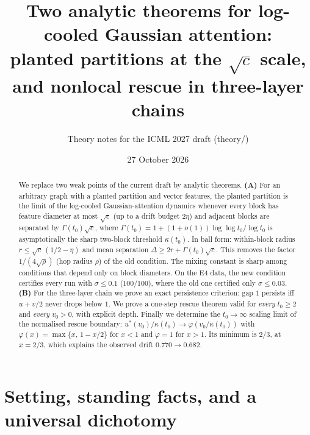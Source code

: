 \documentclass[11pt]{article}
\title{Two analytic theorems for log-cooled Gaussian attention:\\
planted partitions at the $\sqrt c$ scale, and nonlocal rescue in three-layer chains}
\author{Theory notes for the ICML 2027 draft (theory/)}
\date{27 October 2026}
\theoremstyle{definition}
\theoremstyle{remark}
\begin{document}
\maketitle

\begin{abstract}
We replace two weak points of the current draft by analytic theorems.
\textbf{(A)} For an arbitrary graph with a planted partition and vector features, the planted
partition is the limit of the log-cooled Gaussian-attention dynamics whenever every block has
feature diameter at most $\sqrt c$ (up to a drift budget $2\eta$) and adjacent blocks are separated
by $\Gamma(t_0)\sqrt c$, where $\Gamma(t_0) = 1+(1+o(1))\log\log t_0/\log t_0$ is asymptotically
the sharp two-block threshold $\kappa(t_0)$. In ball form: within-block radius $r\le \sqrt c\,(1/2-\eta)$ and
mean separation $\Delta \ge 2r + \Gamma(t_0)\sqrt c$. This removes the factor $1/(4\sqrt{\rho})$
(hop radius $\rho$) of the old condition. The mixing constant is sharp among conditions that depend only on
block diameters. On the E4 data, the new condition certifies every run with $\sigma\le 0.1$
(100/100), where the old one certified only $\sigma\le 0.03$.
\textbf{(B)} For the three-layer chain we prove an exact persistence criterion: gap $1$ persists iff
$u+v/2$ never drops below $1$. We prove a one-step rescue theorem valid for \emph{every} $t_0\ge 2$ and
\emph{every} $v_0>0$, with explicit depth. Finally we determine the $t_0\to\infty$ scaling limit of the normalised rescue
boundary: $u^*(v_0)/\kappa(t_0)\to\varphi(v_0/\kappa(t_0))$ with
$\varphi(x)=\max\{x,\,1-x/2\}$ for $x<1$ and $\varphi=1$ for $x>1$. Its minimum is $2/3$, at $x=2/3$, which
explains the observed drift $0.770\to0.682$.
\end{abstract}

\tableofcontents

\section{Setting, standing facts, and a universal dichotomy}
\end{document}
